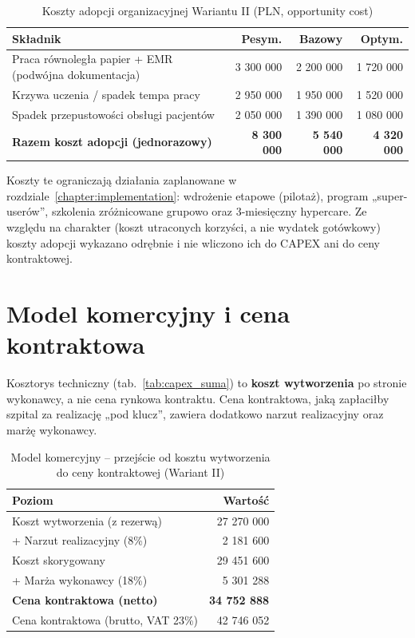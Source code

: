 \begin{table}[h]
\centering
\small
\renewcommand{\arraystretch}{1.2}
\begin{tabular}{|L{8.0cm}|r|r|r|}
\hline
{}\textbf{Składnik} & \textbf{Pesym.} & \textbf{Bazowy} & \textbf{Optym.} \\
\hline
Praca równoległa papier + EMR (podwójna dokumentacja) & 3 300 000 & 2 200 000 & 1 720 000 \\
\hline
Krzywa uczenia / spadek tempa pracy & 2 950 000 & 1 950 000 & 1 520 000 \\
\hline
Spadek przepustowości obsługi pacjentów & 2 050 000 & 1 390 000 & 1 080 000 \\
\hline
{}\textbf{Razem koszt adopcji (jednorazowy)} & \textbf{8 300 000} & \textbf{5 540 000} & \textbf{4 320 000} \\
\hline
\end{tabular}
\caption{Koszty adopcji organizacyjnej Wariantu II (PLN, opportunity cost)}
\label{tab:adopcja}
\end{table}

Koszty te ograniczają działania zaplanowane w rozdziale~\ref{chapter:implementation}: wdrożenie etapowe (pilotaż), program „super-userów”, szkolenia zróżnicowane grupowo oraz 3-miesięczny hypercare. Ze względu na charakter (koszt utraconych korzyści, a nie wydatek gotówkowy) koszty adopcji wykazano odrębnie i nie wliczono ich do CAPEX ani do ceny kontraktowej.

\section{Model komercyjny i cena kontraktowa}

Kosztorys techniczny (tab.~\ref{tab:capex_suma}) to \textbf{koszt wytworzenia} po stronie wykonawcy, a nie cena rynkowa kontraktu. Cena kontraktowa, jaką zapłaciłby szpital za realizację „pod klucz”, zawiera dodatkowo narzut realizacyjny oraz marżę wykonawcy.

\begin{table}[h]
\centering
\small
\renewcommand{\arraystretch}{1.2}
\begin{tabular}{|L{8.5cm}|r|}
\hline
{}\textbf{Poziom} & \textbf{Wartość} \\
\hline
Koszt wytworzenia (z rezerwą) & 27 270 000 \\
\hline
+ Narzut realizacyjny (8\%) & 2 181 600 \\
\hline
Koszt skorygowany & 29 451 600 \\
\hline
+ Marża wykonawcy (18\%) & 5 301 288 \\
\hline
{}\textbf{Cena kontraktowa (netto)} & \textbf{34 752 888} \\
\hline
Cena kontraktowa (brutto, VAT 23\%) & 42 746 052 \\
\hline
\end{tabular}
\caption{Model komercyjny -- przejście od kosztu wytworzenia do ceny kontraktowej (Wariant II)}
\label{tab:komercyjny}
\end{table}

